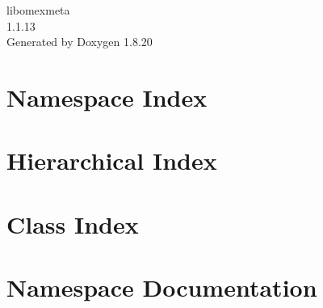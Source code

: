 \let\mypdfximage\pdfximage\def\pdfximage{\immediate\mypdfximage}\documentclass[twoside]{book}
\newcommand{\+}{\discretionary{\mbox{\scriptsize$\hookleftarrow$}}{}{}}
\newcommand{\clearemptydoublepage}{%
  \newpage{\pagestyle{empty}\cleardoublepage}%
}
\begin{document}
\hypersetup{pageanchor=false,
             bookmarksnumbered=true,
             pdfencoding=unicode
            }
\begin{titlepage}
\vspace*{7cm}
\begin{center}%
{\Large libomexmeta \\[1ex]\large 1.\+1.\+13 }\\
\vspace*{1cm}
{\large Generated by Doxygen 1.8.20}\\
\end{center}
\end{titlepage}
\clearemptydoublepage
{}
\tableofcontents
\clearemptydoublepage
{}
\hypersetup{pageanchor=true}

\chapter{Namespace Index}

\chapter{Hierarchical Index}

\chapter{Class Index}

\chapter{Namespace Documentation}

\end{document}
